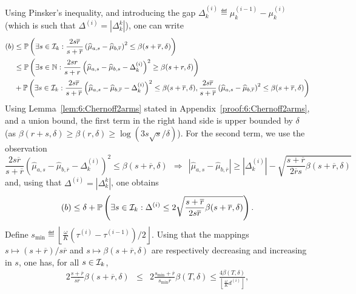 Using Pinsker's inequality, and introducing the gap $\Delta_k^{(i)} \eqdef \mu_k^{(i-1)} - {\mu}_k^{(i)}$ (which is such that $\Delta^{(i)} = |\Delta_k^k|$), one can write
%
\begin{align}
    (b) & \leq \mathbb{P}\left(\exists s \in \mathcal{I}_k : \frac{2s\overline{r}}{s+\overline{r}}\left(\widehat{\mu}_{a,s} - \widehat{\mu}_{b,\overline{r}} \right)^2  \leq \beta(s+\overline{r},\delta)\right)\nonumber\\
    & \leq \mathbb{P}\left(\exists s \in \mathbb{N} : \frac{2sr}{s+r}\left(\widehat{\mu}_{a,s} - \widehat{\mu}_{b,s} - \Delta_k^{(i)}\right)^2  \geq \beta(s+r,\delta)\right) \nonumber\\
    & + \mathbb{P}\left(\exists s \in \mathcal{I}_k : \frac{2s\overline{r}}{s+\overline{r}}\left(\widehat{\mu}_{a,s} - \widehat{\mu}_{b,\overline{r}} - \Delta_k^{(i)}\right)^2  \leq \beta(s+\overline{r},\delta), \frac{2s\overline{r}}{s+\overline{r}}\left(\widehat{\mu}_{a,s} - \widehat{\mu}_{b,\overline{r}}\right)^2  \leq \beta(s+\overline{r},\delta)\right) \nonumber
\end{align}
%
Using Lemma~\ref{lem:6:Chernoff2arms} stated in Appendix~\ref{proof:6:Chernoff2arms}, and a union bound, the first term in the right hand side is upper bounded by $\delta$ (as $\beta(r+s,\delta) \geq \beta(r,\delta) \geq \log(3s\sqrt{s}/\delta)$). For the second term, we use the observation
\[\frac{2s\overline{r}}{s+\overline{r}}\left(\widehat{\mu}_{a,s} - \widehat{\mu}_{b,\overline{r}} - \Delta_k^{(i)}\right)^2  \leq \beta(s+\overline{r},\delta) \ \ \Rightarrow \ \ |\widehat{\mu}_{a,s} - \widehat{\mu}_{b,\overline{r}}| \geq |\Delta_k^{(i)}| - \sqrt{\frac{s+\overline{r}}{2\overline{r}s}\beta(s+\overline{r},\delta)}\]
and, using that $\Delta^{(i)} = |\Delta_k^k|$, one obtains
%
\begin{equation}\label{eq:6:FromHereGlobal}
    (b) \leq \delta + \mathbb{P}\left(\exists s \in \mathcal{I}_k : \Delta^{(i)} \leq 2\sqrt{\frac{s+\overline{r}}{2s\overline{r}}\beta(s+\overline{r},\delta)}\right).
\end{equation}
%
Define $s_{\min} \eqdef \left\lfloor \frac{\omega}{K} (\tau^{(i)}-\tau^{(i-1)})/2\right\rfloor$. Using that the mappings $s \mapsto (s+\overline{r})/s\overline{r}$ and $s \mapsto \beta(s + \overline{r},\delta)$ are respectively decreasing and increasing in $s$, one has, for all $s\in \mathcal{I}_k$,
\begin{eqnarray*}
    2\frac{s+\overline{r}}{s\overline{r}}\beta\left(s+\overline{r}, \delta\right) & \leq &
    2\frac{s_{\min}+\overline{r}}{s_{\min}\overline{r}}\beta\left(T, \delta\right) \leq \frac{4\beta(T,\delta)}{\left\lfloor \frac{\omega}{K}d^{(i)}\right\rfloor},
\end{eqnarray*}
